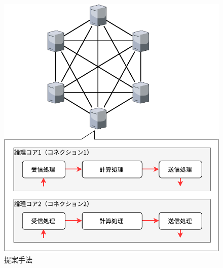 \begin{figure}[htb]
  \centering
  \includegraphics[width=\columnwidth]{pictures/Proposed.pdf}
  \caption{提案手法}
  \label{fig:Proposed}
\end{figure}

